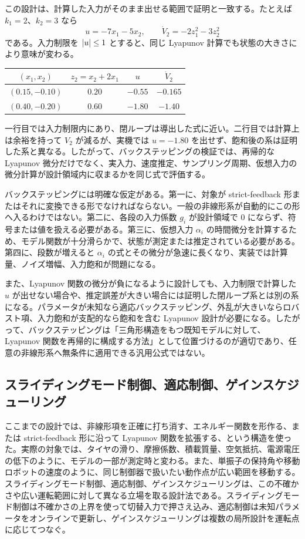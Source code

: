 この設計は、計算した入力がそのまま出せる範囲で証明と一致する。たとえば $k_1=2$、$k_2=3$ なら
\begin{equation}
  u=-7x_1-5x_2,\qquad
  \dot{V}_2=-2z_1^2-3z_2^2
\end{equation}
である。入力制限を $\left|u\right|\le1$ とすると、同じ Lyapunov 計算でも状態の大きさにより意味が変わる。
\begin{center}
\begin{tabular}{c|c|c|c}
$(x_1,x_2)$ & $z_2=x_2+2x_1$ & $u$ & $\dot{V}_2$\\
\hline
$(0.15,-0.10)$ & $0.20$ & $-0.55$ & $-0.165$\\
$(0.40,-0.20)$ & $0.60$ & $-1.80$ & $-1.40$
\end{tabular}
\end{center}
一行目では入力制限内にあり、閉ループは導出した式に近い。二行目では計算上は余裕を持って $V_2$ が減るが、実機では $u=-1.80$ を出せず、飽和後の系は証明した系と異なる。したがって、バックステッピングの検証では、再帰的な Lyapunov 微分だけでなく、実入力、速度推定、サンプリング周期、仮想入力の微分計算が設計領域内に収まるかを同じ式で評価する。

バックステッピングには明確な仮定がある。第一に、対象が strict-feedback 形またはそれに変換できる形でなければならない。一般の非線形系が自動的にこの形へ入るわけではない。第二に、各段の入力係数 $g_i$ が設計領域で 0 にならず、符号または値を扱える必要がある。第三に、仮想入力 $\alpha_i$ の時間微分を計算するため、モデル関数が十分滑らかで、状態が測定または推定されている必要がある。第四に、段数が増えると $\alpha_i$ の式とその微分が急速に長くなり、実装では計算量、ノイズ増幅、入力飽和が問題になる。

また、Lyapunov 関数の微分が負になるように設計しても、入力制限で計算した $u$ が出せない場合や、推定誤差が大きい場合には証明した閉ループ系とは別の系になる。パラメータが未知なら適応バックステッピング、外乱が大きいならロバスト項、入力飽和が支配的なら飽和を含む Lyapunov 設計が必要になる。したがって、バックステッピングは「三角形構造をもつ既知モデルに対して、Lyapunov 関数を再帰的に構成する方法」として位置づけるのが適切であり、任意の非線形系へ無条件に適用できる汎用公式ではない。

\subsection{スライディングモード制御、適応制御、ゲインスケジューリング}

ここまでの設計では、非線形項を正確に打ち消す、エネルギー関数を形作る、または strict-feedback 形に沿って Lyapunov 関数を拡張する、という構造を使った。実際の対象では、タイヤの滑り、摩擦係数、積載質量、空気抵抗、電源電圧の低下のように、モデルの一部が測定時と変わる。また、単振子の保持角や移動ロボットの速度のように、同じ制御器で扱いたい動作点が広い範囲を移動する。スライディングモード制御、適応制御、ゲインスケジューリングは、この不確かさや広い運転範囲に対して異なる立場を取る設計法である。スライディングモード制御は不確かさの上界を使って切替入力で押さえ込み、適応制御は未知パラメータをオンラインで更新し、ゲインスケジューリングは複数の局所設計を運転点に応じてつなぐ。

